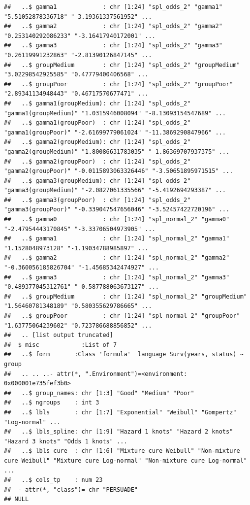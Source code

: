\documentclass[
]{article}
\begin{document}
\begin{verbatim}
##   ..$ gamma1             : chr [1:24] "spl_odds_2" "gamma1" "5.51052878336718" "-3.19361337561952" ...
##   ..$ gamma2             : chr [1:24] "spl_odds_2" "gamma2" "0.253140292086233" "-3.16417940172001" ...
##   ..$ gamma3             : chr [1:24] "spl_odds_2" "gamma3" "0.26119991232863" "-2.81390126847145" ...
##   ..$ groupMedium        : chr [1:24] "spl_odds_2" "groupMedium" "3.02298542925585" "0.47779400406568" ...
##   ..$ groupPoor          : chr [1:24] "spl_odds_2" "groupPoor" "2.89341134948443" "0.46717570677471" ...
##   ..$ gamma1(groupMedium): chr [1:24] "spl_odds_2" "gamma1(groupMedium)" "1.0315946008094" "-8.13093154547689" ...
##   ..$ gamma1(groupPoor)  : chr [1:24] "spl_odds_2" "gamma1(groupPoor)" "-2.61699779061024" "-11.3869290847966" ...
##   ..$ gamma2(groupMedium): chr [1:24] "spl_odds_2" "gamma2(groupMedium)" "1.80086631783035" "-1.86369707937375" ...
##   ..$ gamma2(groupPoor)  : chr [1:24] "spl_odds_2" "gamma2(groupPoor)" "-0.0115893063326446" "-3.50651895971515" ...
##   ..$ gamma3(groupMedium): chr [1:24] "spl_odds_2" "gamma3(groupMedium)" "-2.0827061335566" "-5.4192694293387" ...
##   ..$ gamma3(groupPoor)  : chr [1:24] "spl_odds_2" "gamma3(groupPoor)" "-0.339047547656046" "-3.52457422720196" ...
##   ..$ gamma0             : chr [1:24] "spl_normal_2" "gamma0" "-2.47954443170845" "-3.33706504973905" ...
##   ..$ gamma1             : chr [1:24] "spl_normal_2" "gamma1" "1.1528048973128" "-1.19034788985897" ...
##   ..$ gamma2             : chr [1:24] "spl_normal_2" "gamma2" "-0.360056185826704" "-1.45685342474927" ...
##   ..$ gamma3             : chr [1:24] "spl_normal_2" "gamma3" "0.489377045312761" "-0.587788063673127" ...
##   ..$ groupMedium        : chr [1:24] "spl_normal_2" "groupMedium" "1.56460781348189" "0.580355629786665" ...
##   ..$ groupPoor          : chr [1:24] "spl_normal_2" "groupPoor" "1.63775064239602" "0.723786688856852" ...
##   .. [list output truncated]
##  $ misc            :List of 7
##   ..$ form       :Class 'formula'  language Surv(years, status) ~ group
##   .. .. ..- attr(*, ".Environment")=<environment: 0x000001e735fef3b0> 
##   ..$ group_names: chr [1:3] "Good" "Medium" "Poor"
##   ..$ ngroups    : int 3
##   ..$ lbls       : chr [1:7] "Exponential" "Weibull" "Gompertz" "Log-normal" ...
##   ..$ lbls_spline: chr [1:9] "Hazard 1 knots" "Hazard 2 knots" "Hazard 3 knots" "Odds 1 knots" ...
##   ..$ lbls_cure  : chr [1:6] "Mixture cure Weibull" "Non-mixture cure Weibull" "Mixture cure Log-normal" "Non-mixture cure Log-normal" ...
##   ..$ cols_tp    : num 23
##  - attr(*, "class")= chr "PERSUADE"
## NULL
\end{verbatim}
\end{document}
